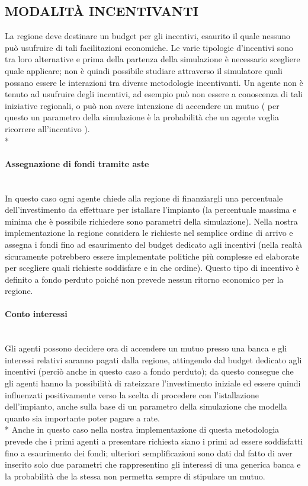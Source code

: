 \documentclass[12pt,a4paper,openright,twoside]{report}
\newcommand{\myparagraph}[1]{\paragraph{#1}\mbox{}\\}
\begin{document}
\subsection{MODALITÀ INCENTIVANTI}

La regione deve destinare un budget per gli incentivi, esaurito il quale nessuno può usufruire di tali facilitazioni economiche. Le varie tipologie d’incentivi sono tra loro alternative e prima della partenza della simulazione è necessario scegliere quale applicare; non è quindi possibile studiare attraverso il simulatore quali possano essere le interazioni tra diverse metodologie incentivanti. Un agente non è tenuto ad usufruire degli incentivi, ad esempio può non essere a conoscenza di tali iniziative regionali, o può non avere intenzione di accendere un mutuo ( per questo un parametro della simulazione è la probabilità che un agente voglia ricorrere all’incentivo ). \\*

\myparagraph{Assegnazione di fondi tramite aste}

In questo caso ogni agente chiede alla regione di finanziargli una percentuale dell'investimento da effettuare per istallare l'impianto (la percentuale massima e minima che è possibile richiedere sono parametri della simulazione). Nella nostra implementazione la regione considera le richieste nel semplice ordine di arrivo e assegna i fondi fino ad esaurimento del budget dedicato agli incentivi (nella realtà sicuramente potrebbero essere implementate politiche più complesse ed elaborate per scegliere quali richieste soddisfare e in che ordine). Questo tipo di incentivo è definito a fondo perduto poiché non prevede nessun ritorno economico per la regione.

\myparagraph{Conto interessi}

Gli agenti possono decidere ora di accendere un mutuo presso una banca e gli interessi relativi saranno pagati dalla regione, attingendo dal budget dedicato agli incentivi (perciò anche in questo caso a fondo perduto); da questo consegue che gli agenti hanno la possibilità di rateizzare l'investimento iniziale ed essere quindi influenzati positivamente verso la scelta di procedere con l'istallazione dell'impianto, anche sulla base di un parametro della simulazione che modella quanto sia importante poter pagare a rate.\\*
Anche in questo caso nella nostra implementazione di questa metodologia prevede che i primi agenti a presentare richiesta siano i primi ad essere soddisfatti fino a esaurimento dei fondi; ulteriori semplificazioni sono dati dal fatto di aver inserito solo due parametri che rappresentino gli interessi di una generica banca e la probabilità che la stessa non permetta sempre di stipulare un mutuo.
\end{document}
